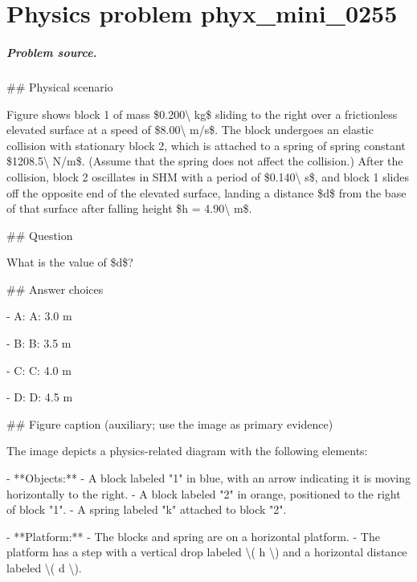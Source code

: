 
\chapter{Physics problem phyx\_mini\_0255}
\label{ch:PhyXMiniProblems_problem_phyx_mini_0255}

\paragraph{Problem source.}
\#\# Physical scenario

Figure shows block 1 of mass \$0.200\textbackslash{} kg\$ sliding to the right over a frictionless elevated surface at a speed of \$8.00\textbackslash{} m/s\$. The block undergoes an elastic collision with stationary block 2, which is attached to a spring of spring constant \$1208.5\textbackslash{} N/m\$. (Assume that the spring does not affect the collision.) After the collision, block 2 oscillates in SHM with a period of \$0.140\textbackslash{} s\$, and block 1 slides off the opposite end of the elevated surface, landing a distance \$d\$ from the base of that surface after falling height \$h = 4.90\textbackslash{} m\$.

\#\# Question

What is the value of \$d\$?

\#\# Answer choices

- A: A: 3.0 m

- B: B: 3.5 m

- C: C: 4.0 m

- D: D: 4.5 m

\#\# Figure caption (auxiliary; use the image as primary evidence)

The image depicts a physics-related diagram with the following elements:

- **Objects:**
  - A block labeled "1" in blue, with an arrow indicating it is moving horizontally to the right.
  - A block labeled "2" in orange, positioned to the right of block "1".
  - A spring labeled "k" attached to block "2".

- **Platform:**
  - The blocks and spring are on a horizontal platform.
  - The platform has a step with a vertical drop labeled \textbackslash{}( h \textbackslash{}) and a horizontal distance labeled \textbackslash{}( d \textbackslash{}).

